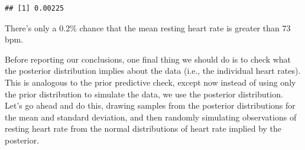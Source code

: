 \documentclass[
]{book}
\newenvironment{Shaded}{\begin{snugshade}}{\end{snugshade}}
\newcommand{\AttributeTok}[1]{\textcolor[rgb]{0.13,0.29,0.53}{#1}}
\newcommand{\CommentTok}[1]{\textcolor[rgb]{0.56,0.35,0.01}{\textit{#1}}}
\newcommand{\DecValTok}[1]{\textcolor[rgb]{0.00,0.00,0.81}{#1}}
\newcommand{\FunctionTok}[1]{\textcolor[rgb]{0.13,0.29,0.53}{\textbf{#1}}}
\newcommand{\NormalTok}[1]{#1}
\newcommand{\OtherTok}[1]{\textcolor[rgb]{0.56,0.35,0.01}{#1}}
\newcommand{\SpecialCharTok}[1]{\textcolor[rgb]{0.81,0.36,0.00}{\textbf{#1}}}
\newcommand{\StringTok}[1]{\textcolor[rgb]{0.31,0.60,0.02}{#1}}
\begin{document}
\begin{Shaded}
\end{Shaded}

\begin{verbatim}
## [1] 0.00225
\end{verbatim}

There's only a 0.2\% chance that the mean resting heart rate is greater than 73 bpm.

Before reporting our conclusions, one final thing we should do is to check what the posterior distribution implies about the data (i.e., the individual heart rates). This is analogous to the prior predictive check, except now instead of using only the prior distribution to simulate the data, we use the posterior distribution. Let's go ahead and do this, drawing samples from the posterior distributions for the mean and standard deviation, and then randomly simulating observations of resting heart rate from the normal distributions of heart rate implied by the posterior.

\begin{Shaded}
\end{Shaded}
\end{document}
